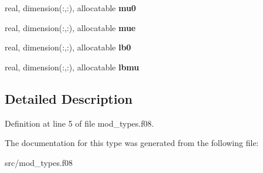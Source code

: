 \begin{DoxyCompactItemize}
\item 
\hypertarget{structtypes_1_1typemod_af279782b398951ad8a789ff28369f23d}{real, dimension(\-:,\-:), allocatable {\bfseries mu0}}\label{structtypes_1_1typemod_af279782b398951ad8a789ff28369f23d}

\item 
\hypertarget{structtypes_1_1typemod_a36373c77f89d78c4a3002c142aeb6e7f}{real, dimension(\-:,\-:), allocatable {\bfseries mue}}\label{structtypes_1_1typemod_a36373c77f89d78c4a3002c142aeb6e7f}

\item 
\hypertarget{structtypes_1_1typemod_ac76bbff5d8056371c458273a6029ae04}{real, dimension(\-:,\-:), allocatable {\bfseries lb0}}\label{structtypes_1_1typemod_ac76bbff5d8056371c458273a6029ae04}

\item 
\hypertarget{structtypes_1_1typemod_a0d2baab7f301a8ec74572edabc7e1f0c}{real, dimension(\-:,\-:), allocatable {\bfseries lbmu}}\label{structtypes_1_1typemod_a0d2baab7f301a8ec74572edabc7e1f0c}

\end{DoxyCompactItemize}


\subsection{Detailed Description}


Definition at line 5 of file mod\-\_\-types.\-f08.



The documentation for this type was generated from the following file\-:\begin{DoxyCompactItemize}
\item 
src/mod\-\_\-types.\-f08\end{DoxyCompactItemize}
